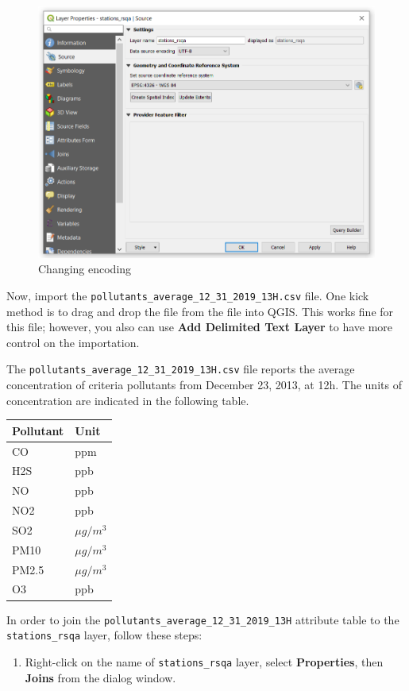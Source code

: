 \documentclass[]{book}
\providecommand{\tightlist}{%
  \setlength{\itemsep}{0pt}\setlength{\parskip}{0pt}}
\theoremstyle{definition}
\theoremstyle{definition}
\theoremstyle{definition}
\theoremstyle{remark}
\begin{document}
\begin{figure}

{\centering \includegraphics[width=12.79in]{figures/Change_Encoding_2} 

}

\caption{Changing encoding}\label{fig:unnamed-chunk-13}
\end{figure}

Now, import the \texttt{pollutants\_average\_12\_31\_2019\_13H.csv}
file. One kick method is to drag and drop the file from the file into
QGIS. This works fine for this file; however, you also can use
\textbf{Add Delimited Text Layer} to have more control on the
importation.

The \texttt{pollutants\_average\_12\_31\_2019\_13H.csv} file reports the
average concentration of criteria pollutants from December 23, 2013, at
12h. The units of concentration are indicated in the following table.

\begin{longtable}[]{@{}ll@{}}
\toprule
Pollutant & Unit\tabularnewline
\midrule
\endhead
CO & ppm\tabularnewline
H2S & ppb\tabularnewline
NO & ppb\tabularnewline
NO2 & ppb\tabularnewline
SO2 & \(\mu g/m^3\)\tabularnewline
PM10 & \(\mu g/m^3\)\tabularnewline
PM2.5 & \(\mu g/m^3\)\tabularnewline
O3 & ppb\tabularnewline
\bottomrule
\end{longtable}

In order to join the \texttt{pollutants\_average\_12\_31\_2019\_13H}
attribute table to the \texttt{stations\_rsqa} layer, follow these
steps:

\begin{enumerate}
\def\labelenumi{\arabic{enumi}.}
\tightlist
\item
  Right-click on the name of \texttt{stations\_rsqa} layer, select
  \textbf{Properties}, then \textbf{Joins} from the dialog window.
\end{enumerate}
\end{document}
